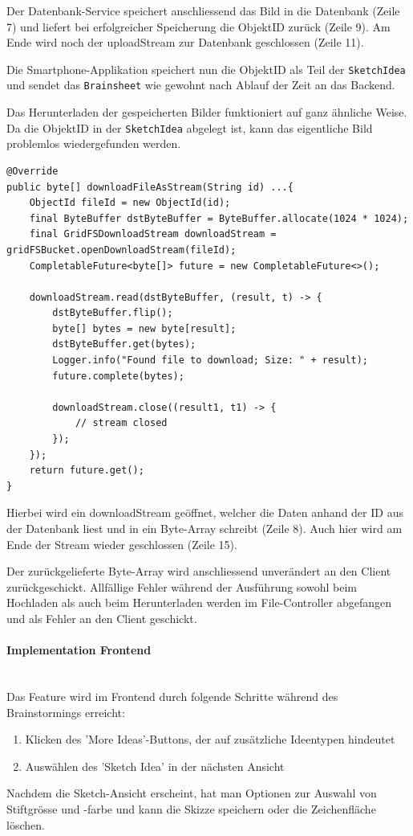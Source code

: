 Der Datenbank-Service speichert anschliessend das Bild in die Datenbank (Zeile 7) und liefert bei erfolgreicher Speicherung die ObjektID zurück (Zeile 9). Am Ende wird noch der uploadStream zur Datenbank geschlossen (Zeile 11).

Die Smartphone-Applikation speichert nun die ObjektID als Teil der \texttt{SketchIdea} und sendet das \texttt{Brainsheet} wie gewohnt nach Ablauf der Zeit an das Backend.

Das Herunterladen der gespeicherten Bilder funktioniert auf ganz ähnliche Weise. Da die ObjektID in der \texttt{SketchIdea} abgelegt ist, kann das eigentliche Bild problemlos wiedergefunden werden.

\begin{lstlisting}[caption={Download File im DB Service}, label=uploadFileDBService]
@Override
public byte[] downloadFileAsStream(String id) ...{
    ObjectId fileId = new ObjectId(id);
    final ByteBuffer dstByteBuffer = ByteBuffer.allocate(1024 * 1024);
    final GridFSDownloadStream downloadStream = gridFSBucket.openDownloadStream(fileId);
    CompletableFuture<byte[]> future = new CompletableFuture<>();

    downloadStream.read(dstByteBuffer, (result, t) -> {
        dstByteBuffer.flip();
        byte[] bytes = new byte[result];
        dstByteBuffer.get(bytes);
        Logger.info("Found file to download; Size: " + result);
        future.complete(bytes);

        downloadStream.close((result1, t1) -> {
            // stream closed
        });
    });
    return future.get();
}
\end{lstlisting}

Hierbei wird ein downloadStream geöffnet, welcher die Daten anhand der ID aus der Datenbank liest und in ein Byte-Array schreibt (Zeile 8). Auch hier wird am Ende der Stream wieder geschlossen (Zeile 15).

Der zurückgelieferte Byte-Array wird anschliessend unverändert an den Client zurück\-geschickt. Allfällige Fehler während der Ausführung sowohl beim Hochladen als auch beim Herunterladen werden im File-Controller abgefangen und als Fehler an den Client geschickt.

\paragraph*{Implementation Frontend}~\\
Das Feature wird im Frontend durch folgende Schritte während des Brainstormings erreicht:
\begin{enumerate}
	\item Klicken des 'More Ideas'-Buttons, der auf zusätzliche Ideentypen hindeutet
	\item Auswählen des 'Sketch Idea' in der nächsten Ansicht
\end{enumerate}
Nachdem die Sketch-Ansicht erscheint, hat man Optionen zur Auswahl von Stiftgrösse und -farbe und kann die Skizze speichern oder die Zeichenfläche löschen.

